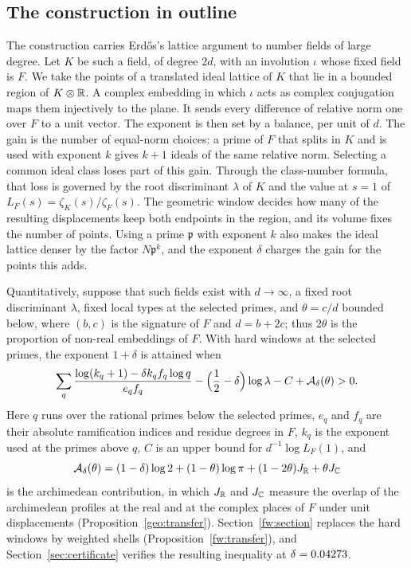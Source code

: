 \subsection{The construction in outline}\label{intro:outline}
The construction carries Erd\H{o}s's lattice argument to number fields
of large degree. Let $K$ be such a field, of degree $2d$, with an
involution $\iota$ whose fixed field is $F$. We take the points of a
translated ideal lattice of $K$ that lie in a bounded region of
$K\otimes\mathbb R$. A complex embedding in which $\iota$ acts as complex
conjugation maps them injectively to the plane. It sends every
difference of relative norm one over $F$ to a unit vector. The exponent
is then set by a balance, per unit of $d$. The gain is the number of
equal-norm choices: a prime of $F$ that splits in $K$ and is used with
exponent $k$ gives $k+1$ ideals of the same relative norm. Selecting a
common ideal class loses part of this gain. Through the class-number
formula, that loss is governed by the root discriminant $\lambda$ of $K$
and the value at $s=1$ of $L_F(s)=\zeta_K(s)/\zeta_F(s)$. The geometric
window decides how many of the resulting displacements keep both
endpoints in the region, and its volume fixes the number of points.
Using a prime $\mathfrak p$ with exponent $k$ also makes the ideal
lattice denser by the factor $N\mathfrak p^k$, and the exponent $\delta$
charges the gain for the points this adds.

Quantitatively, suppose that such fields exist with $d\to\infty$, a fixed
root discriminant $\lambda$, fixed local types at the selected primes,
and $\theta=c/d$ bounded below, where $(b,c)$ is the signature of $F$ and
$d=b+2c$; thus $2\theta$ is the proportion of non-real embeddings of $F$.
With hard windows at the selected primes, the exponent $1+\delta$ is
attained when
\begin{equation}\label{intro:margin}
 \sum_q\frac{\log(k_q+1)-\delta k_qf_q\log q}{e_qf_q}
 -\Bigl(\frac12-\delta\Bigr)\log\lambda-C+\mathcal A_\delta(\theta)>0.
\end{equation}
Here $q$ runs over the rational primes below the selected primes, $e_q$
and $f_q$ are their absolute ramification indices and residue degrees in
$F$, $k_q$ is the exponent used at the primes above $q$, $C$ is an upper
bound for $d^{-1}\log L_F(1)$, and
\[
 \mathcal A_\delta(\theta)=(1-\delta)\log2+(1-\theta)\log\pi
 +(1-2\theta)J_\mathbb R+\theta J_\mathbb C
\]
is the archimedean contribution, in which $J_\mathbb R$ and $J_\mathbb C$ measure the
overlap of the archimedean profiles at the real and at the complex
places of $F$ under unit displacements (Proposition~\ref{geo:transfer}).
Section~\ref{fw:section} replaces the hard windows by weighted shells
(Proposition~\ref{fw:transfer}), and Section~\ref{sec:certificate}
verifies the resulting inequality at $\delta=0.04273$.


